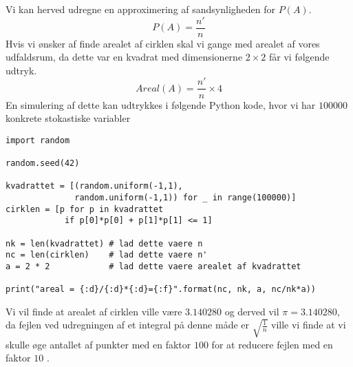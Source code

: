 \documentclass[../../SRP.tex]{subfiles}
\begin{document}
\begin{center}
\end{center}

Vi kan herved udregne en approximering af sandsynligheden for $P(A)$.
\begin{equation}
  P(A) = \frac{n'}{n}
\end{equation}
Hvis vi ønsker af finde arealet af cirklen skal vi gange med arealet af vores udfaldsrum, da dette var en kvadrat med dimensionerne $2 \times 2$ får vi følgende udtryk.
\begin{equation}
  Areal(A) = \frac{n'}{n} \times 4
\end{equation}
En simulering af dette kan udtrykkes i følgende Python kode, hvor vi har $100000$ konkrete stokastiske variabler \\

\begin{lstlisting}
import random

random.seed(42)

kvadrattet = [(random.uniform(-1,1), 
              random.uniform(-1,1)) for _ in range(100000)]
cirklen = [p for p in kvadrattet
            if p[0]*p[0] + p[1]*p[1] <= 1]

nk = len(kvadrattet) # lad dette vaere n
nc = len(cirklen)    # lad dette vaere n'
a = 2 * 2            # lad dette vaere arealet af kvadrattet

print("areal = {:d}/{:d}*{:d}={:f}".format(nc, nk, a, nc/nk*a))
\end{lstlisting}
Vi vil finde at arealet af cirklen ville være $3.140280$ og derved vil $\pi = 3.140280$, da fejlen ved udregningen af et integral på denne måde er $\sqrt{\frac{1}{n}}$ ville vi finde at vi skulle øge antallet af punkter med en faktor $100$ for at reducere fejlen med en faktor $10$ \cite{SBM}. \\
\end{document}

